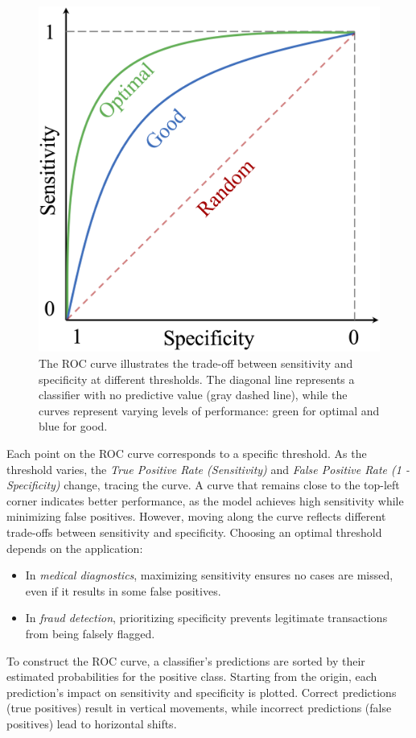 \documentclass[
]{book}
\providecommand{\tightlist}{%
  \setlength{\itemsep}{0pt}\setlength{\parskip}{0pt}}
\theoremstyle{definition}
\theoremstyle{definition}
\theoremstyle{definition}
\theoremstyle{definition}
\theoremstyle{remark}
\begin{document}
\begin{figure}

{\centering \includegraphics[width=0.6\linewidth]{images/ch8_roc-curve} 

}

\caption{The ROC curve illustrates the trade-off between sensitivity and specificity at different thresholds. The diagonal line represents a classifier with no predictive value (gray dashed line), while the curves represent varying levels of performance: green for optimal and blue for good.}\label{fig:roc-curve}
\end{figure}

Each point on the ROC curve corresponds to a specific threshold. As the threshold varies, the \emph{True Positive Rate (Sensitivity)} and \emph{False Positive Rate (1 - Specificity)} change, tracing the curve. A curve that remains close to the top-left corner indicates better performance, as the model achieves high sensitivity while minimizing false positives. However, moving along the curve reflects different trade-offs between sensitivity and specificity. Choosing an optimal threshold depends on the application:

\begin{itemize}
\tightlist
\item
  In \emph{medical diagnostics}, maximizing sensitivity ensures no cases are missed, even if it results in some false positives.\\
\item
  In \emph{fraud detection}, prioritizing specificity prevents legitimate transactions from being falsely flagged.
\end{itemize}

To construct the ROC curve, a classifier's predictions are sorted by their estimated probabilities for the positive class. Starting from the origin, each prediction's impact on sensitivity and specificity is plotted. Correct predictions (true positives) result in vertical movements, while incorrect predictions (false positives) lead to horizontal shifts.
\end{document}
